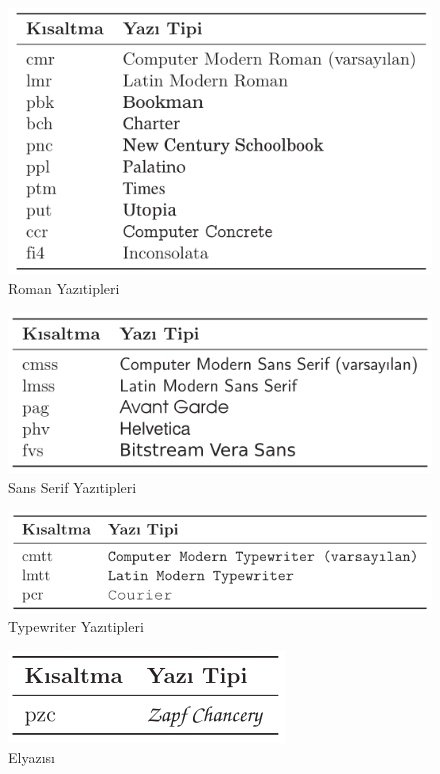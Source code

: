 \documentclass[
  10pt,
]{scrbook}
\begin{document}
\begin{figure}
\centering
\includegraphics{images/yazitipi2.png}
\caption{Roman
Yazıtipleri}
\end{figure}

\begin{figure}
\centering
\includegraphics{images/yazitipi3.png}
\caption{Sans Serif
Yazıtipleri}
\end{figure}

\begin{figure}
\centering
\includegraphics{images/yazitipi4.png}
\caption{Typewriter Yazıtipleri\\
}
\end{figure}

\begin{figure}
\centering
\includegraphics{images/yazitipi5.png}
\caption{Elyazısı}
\end{figure}
\end{document}
